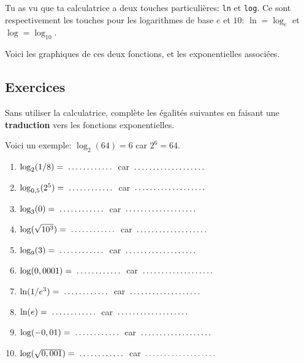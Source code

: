 \documentclass[a4paper,12pt,singlepage]{report}
\newcommand{\jdot}[1]{ \makebox[#1]{\dotfill}}
\begin{document}
Tu as vu que ta calculatrice a deux touches particulières: \texttt{ln} et
\texttt{log}. Ce sont respectivement les touches pour les logarithmes de base
\(e\) et \(10\): \(\ln=\log_e\) et \(\log=\log_{10}\).

Voici les graphiques de ces deux fonctions, et les exponentielles associées.


\begin{center}

\end{center}

\subsection{Exercices}
\label{sec:org98bb4aa}

\begin{exercice}
Sans utiliser la calculatrice, complète les égalités suivantes en faisant une
\textbf{traduction} vers les fonctions exponentielles.

Voici un exemple: \(\log_2(64)=6\) car \(2^6=64\).

\begin{enumerate}
\item \(\log_{2}(1/8)=\jdot{2cm}\) car \(\jdot{3cm}\)

\item \(\log_{0,5}(2^5)=\jdot{2cm}\) car \(\jdot{3cm}\)

\item \(\log_{3}(0)=\jdot{2cm}\) car \(\jdot{3cm}\)

\item \(\log(\sqrt{10^3})=\jdot{2cm}\) car \(\jdot{3cm}\)

\item \(\log_{9}(3)=\jdot{2cm}\) car \(\jdot{3cm}\)

\item \(\log(0,0001)=\jdot{2cm}\) car \(\jdot{3cm}\)

\item \(\ln(1/e^3)=\jdot{2cm}\) car \(\jdot{3cm}\)

\item \(\ln(e)=\jdot{2cm}\) car \(\jdot{3cm}\)

\item \(\log(-0,01)=\jdot{2cm}\) car \(\jdot{3cm}\)

\item \(\log(\sqrt{0,001})=\jdot{2cm}\) car \(\jdot{3cm}\)
\end{enumerate}
\end{exercice}
\end{document}
